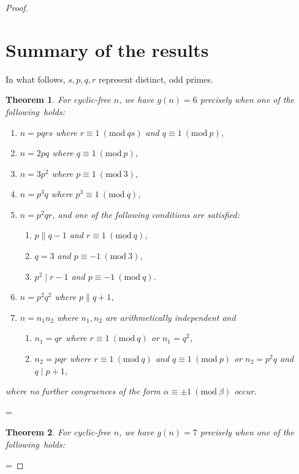 \documentclass[a4paper, 12pt]{article}
\newenvironment{keepintact}
  {\par\nobreak\vfil\penalty0\vfilneg
   \vtop\bgroup}
  {\par\xdef\tpd{\the\prevdepth}\egroup
   \prevdepth=\tpd}
\newcommand{\Mod}[1]{\ (\mathrm{mod} \ #1)}
\theoremstyle{plain}
\newtheorem{thm}{Theorem}[section]
\theoremstyle{definition}
\begin{document}
\begin{proof}
\section{Summary of the results}
\begin{keepintact}
In what follows, $s, p, q, r$ represent distinct, odd primes.
\nopagebreak
{}
\begin{thm}
	For cyclic-free $n$, we have $g(n) = 6$ precisely when one of the \mbox{following holds:}
	\begin{enumerate} \listspace
		\item$n = pqrs$ where $r \equiv 1 \Mod{qs}$ and $q \equiv 1 \Mod{p}$,\nopagebreak[4] 
		\item\nopagebreak[4] $n = 2pq$ where $q \equiv 1 \Mod{p}$,
		\item $n = 3p^2$ where $p \equiv 1 \Mod{3}$,
		\item $n = p^3 q$ where $p^3 \equiv 1 \Mod{q}$,
		\item $n = p^2 q r$, and one of the following conditions are satisfied:
		\begin{enumerate}
			\item $p \parallel q - 1$ and $r \equiv 1 \Mod{q}$,
			\item $q = 3$ and $p \equiv -1 \Mod{3}$, \nopagebreak[4]
			\item\nopagebreak[4] $p^2 \mid r - 1$ and $p \equiv -1 \Mod{q}$.
		\end{enumerate}
		\item $n = p^2 q^2$ where $p \parallel q + 1$,
		\item $n = n_1 n_2$ where $n_1, n_2$ are arithmetically independent and
		\begin{enumerate}
			\item $n_1 = qr$ where $r \equiv 1 \Mod{q}$ or $n_1 = q^2$,
			\item $n_2 = pqr$ where $r \equiv 1 \Mod{q}$ and $q \equiv 1 \Mod{p}$ or $n_2 = p^2 q$ and $q \mid p + 1$,
		\end{enumerate}
	\end{enumerate} \textspace
	where no further congruences of the form $\alpha \equiv \pm 1 \Mod{\beta}$ \nolinebreak[4] \mbox{occur}.
\end{thm}
\end{keepintact}
\begin{keepintact}
\begin{thm}
	For cyclic-free $n$, we have $g(n) = 7$ precisely when one of the \mbox{following holds:}
	\begin{enumerate}	\listspace

\end{enumerate}
\end{thm}
\end{keepintact}
\end{proof}
\end{document}
